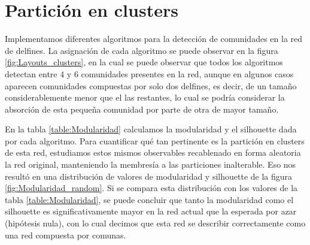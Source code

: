 \section{Partición en clusters}

\par Implementamos diferentes algoritmos para la detección de comunidades en la red de delfines. La asignación de cada algoritmo se puede observar en la figura \ref{fig:Layouts_clusters}, en la cual se puede observar que todos los algoritmos detectan entre 4 y 6 comunidades presentes en la red, aunque en algunos casos aparecen comunidades compuestas por solo dos delfines, es decir, de un tamaño considerablemente menor que el las restantes, lo cual se podría considerar la absorción de esta pequeña comunidad por parte de otra de mayor tamaño.
\par En la tabla \ref{table:Modularidad} calculamos la modularidad y el silhouette dada por cada algoritmo. Para cuantificar qué tan pertinente es la partición en clusters de esta red, estudiamos estos mismos observables recablenado en forma aleatoria la red original, manteniendo la membresía a las particiones inalterable. Eso nos resultó en una distribución de valores de modularidad y silhouette de la figura \ref{fig:Modularidad_random}. Si se compara esta distribución con los valores de la tabla \ref{table:Modularidad}, se puede concluir que tanto la modularidad como el silhouette es significativamente mayor en la red actual que la esperada por azar (hipótesis nula), con lo cual decimos que esta red se describir correctamente como una red compuesta por comunas.

